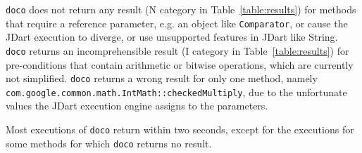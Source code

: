 \texttt{doco} does not return any result (N category in Table~\ref{table:results}) for methods that require a reference parameter, e.g. an object like \texttt{Comparator}, or cause the JDart execution to diverge, or  use unsupported features in JDart like String. \texttt{doco} returns an incomprehensible result (I category in Table~\ref{table:results}) for pre-conditions that contain arithmetic or bitwise operations, which are currently not simplified. \texttt{doco} returns a wrong result for only one method, namely \texttt{com.google.common.math.IntMath::checkedMultiply}, due to the unfortunate values the JDart execution engine assigns to the parameters.

Most executions of \texttt{doco} return within two seconds, except for the executions for some methods for which \texttt{doco} returns no result.
